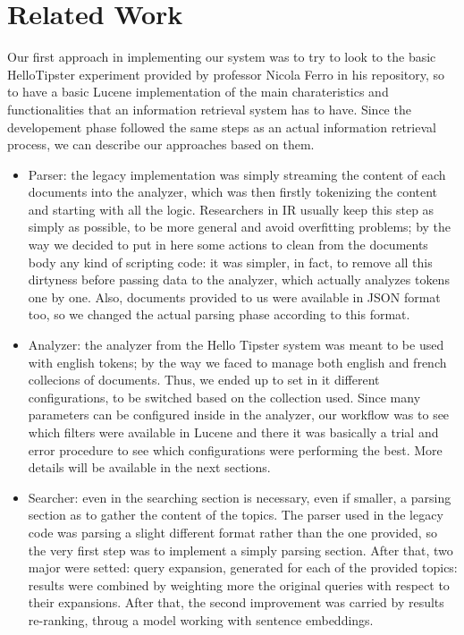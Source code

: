 \section{Related Work}
\label{sec:related}

Our first approach in implementing our system was to try to look to the basic HelloTipster 
experiment provided by professor Nicola Ferro in his repository, so to have a basic Lucene implementation
of the main charateristics and functionalities that an information retrieval system has to have.
Since the developement phase followed the same steps as an actual information retrieval process,
we can describe our approaches based on them.

\begin{itemize}
    \item Parser: the legacy implementation was simply streaming the content of each documents into the analyzer, which was then firstly tokenizing the content and starting with all the logic. Researchers in IR usually keep this step as simply as possible, to be more general and avoid overfitting problems; by the way we decided to put in here some actions to clean from the documents body any kind of scripting code: it was simpler, in fact, to remove all this dirtyness before passing data to the analyzer, which actually analyzes tokens one by one. Also, documents provided to us were available in JSON format too, so we changed the actual parsing phase according to this format.
    \item Analyzer: the analyzer from the Hello Tipster system was meant to be used with english tokens; by the way we faced to manage both english and french collecions of documents. Thus, we ended up to set in it different configurations, to be switched based on the collection used. Since many parameters can be configured inside in the analyzer, our workflow was to see which filters were available in Lucene and there it was basically a trial and error procedure to see which configurations were performing the best. More details will be available in the next sections.
    \item Searcher: even in the searching section is necessary, even if smaller, a parsing section as to gather the content of the topics. The parser used in the legacy code was parsing a slight different format rather than the one provided, so the very first step was to implement a simply parsing section. After that, two major were setted: query expansion, generated for each of the provided topics: results were combined by weighting more the original queries with respect to their expansions. After that, the second improvement was carried by results re-ranking, throug a model working with sentence embeddings.
\end{itemize}

\pagebreak